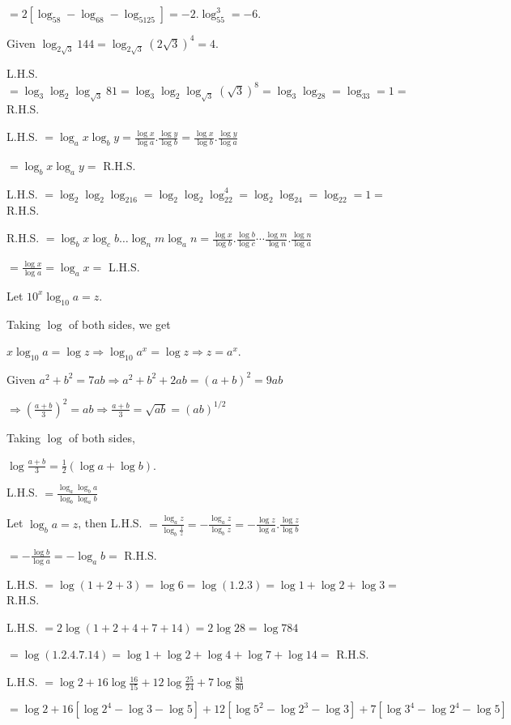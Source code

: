   $= 2[\log_58 - \log_68 - \log_5125] = -2.\log_55^3 = -6$.
\item Given $\log_{2\sqrt{3}}144 = \log_{2\sqrt{3}}(2\sqrt{3})^4 = 4$.
\item L.H.S. $= \log_3\log_2\log_{\sqrt{3}}81 = \log_3\log_2\log_{\sqrt{3}}(\sqrt{3})^8 = \log_3\log_28 = \log_33 = 1 =$ R.H.S.
\item L.H.S. $= \log_ax\log_by = \frac{\log x}{\log a}.\frac{\log y}{\log b} = \frac{\log x}{\log b}.\frac{\log y}{\log a}$

  $= \log_bx\log_ay =$ R.H.S.
\item L.H.S. $= \log_2\log_2\log_216 = \log_2\log_2\log_22^4 = \log_2\log_24 = \log_22 = 1 =$ R.H.S.
\item R.H.S. $= \log_bx\log_cb\ldots\log_nm\log_an = \frac{\log x}{\log b}.\frac{\log b}{\log c}\cdots\frac{\log m}{\log
  n}.\frac{\log n}{\log a}$

  $= \frac{\log x}{\log a} = \log_ax =$ L.H.S.
\item Let $10^x\log_{10}a = z$.

  Taking $\log$ of both sides, we get

  $x\log_{10}a = \log z \Rightarrow \log_{10}a^x = \log z \Rightarrow z = a^x$.
\item Given $a^2 + b^2 = 7ab \Rightarrow a^2 + b^2 + 2ab = (a + b)^2 = 9ab$

  $\Rightarrow \left(\frac{a + b}{3}\right)^2 = ab \Rightarrow \frac{a + b}{3} = \sqrt{ab} = (ab)^{1/2}$

  Taking $\log$ of both sides,

  $\log \frac{a + b}{3} = \frac{1}{2}(\log a + \log b)$.
\item L.H.S. $= \frac{\log_a\log_ba}{\log_b\log_ab}$

  Let $\log_ba = z$, then L.H.S. $= \frac{\log_az}{\log_b\tfrac{1}{z}} = -\frac{\log_az}{\log_bz} = -\frac{\log z}{\log a}.\frac{\log z}{\log b}$

  $= - \frac{\log b}{\log a} = -\log_ab =$ R.H.S.
\item L.H.S. $= \log(1 + 2 + 3) = \log 6 = \log(1.2.3) = \log 1 + \log 2 + \log 3 =$ R.H.S.
\item L.H.S. $= 2\log(1 + 2 + 4 + 7 + 14) = 2\log 28 = \log 784$

  $= \log(1.2.4.7.14) = \log 1 + \log 2 + \log 4 + \log 7 + \log 14 =$ R.H.S.
\item L.H.S. $= \log 2 + 16\log\frac{16}{15} + 12\log\frac{25}{24} + 7\log\frac{81}{80}$

  $= \log 2 + 16[\log 2^4 - \log 3 - \log 5] + 12[\log 5^2 - \log 2^3 - \log 3] + 7[\log 3^4 - \log 2^4 - \log 5]$


